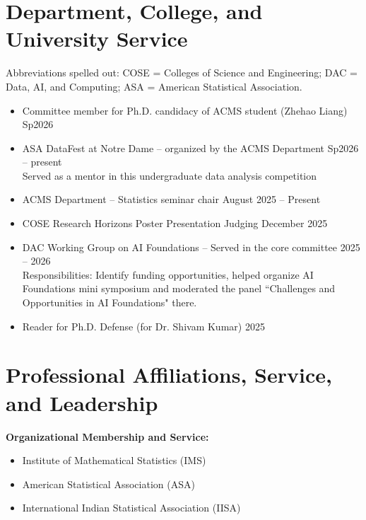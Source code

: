 \documentclass[11pt]{article}
\begin{document}
	\section*{Department, College, and University Service}
	\noindent Abbreviations spelled out: COSE = Colleges of Science and Engineering; DAC = Data, AI, and Computing; ASA = American Statistical Association.
	\begin{itemize}[leftmargin=0pt, label={}]
		
		
		\item Committee member for Ph.D. candidacy of ACMS student (Zhehao Liang)
		\hfill  Sp2026
		\item ASA DataFest at Notre Dame -- organized by the ACMS Department
		\hfill Sp2026 -- present\\
		Served as a mentor in this undergraduate data analysis competition
		\item ACMS Department -- Statistics seminar chair \hfill August 2025 -- Present
		\item COSE Research Horizons Poster Presentation Judging \hfill December 2025
		\item DAC Working Group on AI Foundations --  Served in the core committee
		\hfill 2025 -- 2026\\
		Responsibilities: Identify funding opportunities, helped organize AI Foundations mini symposium and moderated the panel ``Challenges and Opportunities in AI Foundations" there.
		
		\item Reader for Ph.D. Defense (for Dr. Shivam Kumar)
		\hfill 2025
		
		
		
	\end{itemize}
	
	\section*{Professional Affiliations, Service, and Leadership}
	
	\noindent\textbf{Organizational Membership and Service:}
	\begin{itemize}[leftmargin=0pt, label={}]
		\item Institute of Mathematical Statistics (IMS)
		
		\item American Statistical Association (ASA)
		
		\item International Indian Statistical Association (IISA)
		
	\end{itemize}
	
\end{document}
